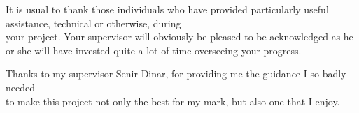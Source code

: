 It is usual to thank those individuals who have provided particularly useful assistance, technical or otherwise, during\\ your project. Your supervisor will obviously be pleased to be acknowledged as he or she will have invested quite a lot of time overseeing your progress.

Thanks to my supervisor Senir Dinar, for providing me the guidance I so badly needed\\ to make this project not only the best for my mark, but also one that I enjoy.